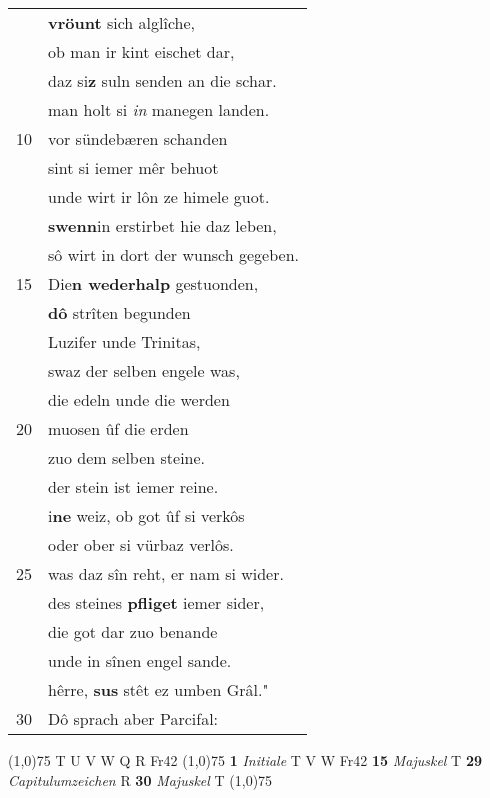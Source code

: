 \documentclass[8pt,a4paper,notitlepage]{article}
\begin{document}
\begin{table}[ht]
\begin{minipage}[t]{0.5\linewidth}
\begin{tabular}{rl}
 & \textbf{vröunt} sich alglîche,\\ 
 & ob man ir kint eischet dar,\\ 
 & daz si\textbf{z} suln senden an die schar.\\ 
 & man holt si \textit{in} manegen landen.\\ 
10 & vor sündebæren schanden\\ 
 & sint si iemer mêr behuot\\ 
 & unde wirt ir lôn ze himele guot.\\ 
 & \textbf{swenn}in erstirbet hie daz leben,\\ 
 & sô wirt in dort der wunsch gegeben.\\ 
15 & Die\textbf{n wederhalp} gestuonden,\\ 
 & \textbf{dô} strîten begunden\\ 
 & Luzifer unde Trinitas,\\ 
 & swaz der selben engele was,\\ 
 & die edeln unde die werden\\ 
20 & muosen ûf die erden\\ 
 & zuo dem selben steine.\\ 
 & der stein ist iemer reine.\\ 
 & i\textbf{ne} weiz, ob got ûf si verkôs\\ 
 & oder ober si vürbaz verlôs.\\ 
25 & was daz sîn reht, er nam si wider.\\ 
 & des steines \textbf{pfliget} iemer sider,\\ 
 & die got dar zuo benande\\ 
 & unde in sînen engel sande.\\ 
 & hêrre, \textbf{sus} stêt ez umben Grâl."\\ 
30 & Dô sprach aber Parcifal:\\ 
\end{tabular}
\scriptsize
\line(1,0){75} \newline
T U V W Q R Fr42 \newline
\line(1,0){75} \newline
\textbf{1} \textit{Initiale} T V W Fr42  \textbf{15} \textit{Majuskel} T  \textbf{29} \textit{Capitulumzeichen} R  \textbf{30} \textit{Majuskel} T  \newline
\line(1,0){75} \newline

\end{minipage}
\end{table}
\end{document}
